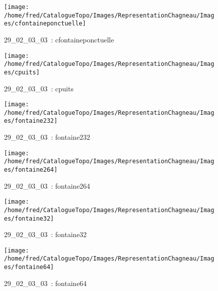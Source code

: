 \documentclass[12pt,titlepage]{book}
\begin{document}
\begin{figure}[h!]
\begin{minipage}[t]{3cm}
\begin{center}
    \end{center}
  \end{minipage}
  \begin{minipage}[t]{3cm}
    \begin{center}
      \texttt{[image: /home/fred/CatalogueTopo/Images/RepresentationChagneau/Images/cfontaineponctuelle]}
      \caption[~29\_02\_03\_03]{\small{29\_02\_03\_03~:} \tiny{cfontaineponctuelle}}\label{cfontaineponctuelle}
    \end{center}
  \end{minipage}
  \begin{minipage}[t]{3cm}
    \begin{center}
      \texttt{[image: /home/fred/CatalogueTopo/Images/RepresentationChagneau/Images/cpuits]}
      \caption[~29\_02\_03\_03]{\small{29\_02\_03\_03~:} \tiny{cpuits}}\label{cpuits}
    \end{center}
  \end{minipage}
  \begin{minipage}[t]{3cm}
    \begin{center}
      \texttt{[image: /home/fred/CatalogueTopo/Images/RepresentationChagneau/Images/fontaine232]}
      \caption[~29\_02\_03\_03]{\small{29\_02\_03\_03~:} \tiny{fontaine232}}\label{fontaine232}
    \end{center}
  \end{minipage}
  \begin{minipage}[t]{3cm}
    \begin{center}
      \texttt{[image: /home/fred/CatalogueTopo/Images/RepresentationChagneau/Images/fontaine264]}
      \caption[~29\_02\_03\_03]{\small{29\_02\_03\_03~:} \tiny{fontaine264}}\label{fontaine264}
    \end{center}
  \end{minipage}
  \begin{minipage}[t]{3cm}
    \begin{center}
      \texttt{[image: /home/fred/CatalogueTopo/Images/RepresentationChagneau/Images/fontaine32]}
      \caption[~29\_02\_03\_03]{\small{29\_02\_03\_03~:} \tiny{fontaine32}}\label{fontaine32}
    \end{center}
  \end{minipage}
  \begin{minipage}[t]{3cm}
    \begin{center}
      \texttt{[image: /home/fred/CatalogueTopo/Images/RepresentationChagneau/Images/fontaine64]}
      \caption[~29\_02\_03\_03]{\small{29\_02\_03\_03~:} \tiny{fontaine64}}\label{fontaine64}
    \end{center}
  \end{minipage}
\end{figure}
\end{document}
